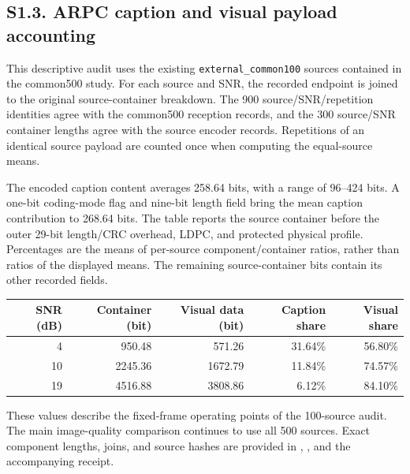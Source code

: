 \clearpage\subsection*{S1.3. ARPC caption and visual payload accounting}
This descriptive audit uses the existing \texttt{external\_common100} sources contained in the common500 study. For each source and SNR, the recorded endpoint is joined to the original source-container breakdown. The 900 source/SNR/repetition identities agree with the common500 reception records, and the 300 source/SNR container lengths agree with the source encoder records. Repetitions of an identical source payload are counted once when computing the equal-source means.

The encoded caption content averages 258.64 bits, with a range of 96--424 bits. A one-bit coding-mode flag and nine-bit length field bring the mean caption contribution to 268.64 bits. The table reports the source container before the outer 29-bit length/CRC overhead, LDPC, and protected physical profile. Percentages are the means of per-source component/container ratios, rather than ratios of the displayed means. The remaining source-container bits contain its other recorded fields.

\begin{center}\small\setlength{\tabcolsep}{6pt}
\begin{tabular}{rrrrr}\toprule
SNR (dB) & Container (bit) & Visual data (bit) & Caption share & Visual share\\\midrule
4 & 950.48 & 571.26 & 31.64\% & 56.80\%\\
10 & 2245.36 & 1672.79 & 11.84\% & 74.57\%\\
19 & 4516.88 & 3808.86 & 6.12\% & 84.10\%\\
\bottomrule\end{tabular}\end{center}

These values describe the fixed-frame operating points of the 100-source audit. The main image-quality comparison continues to use all 500 sources. Exact component lengths, joins, and source hashes are provided in
,
, and the accompanying receipt.
